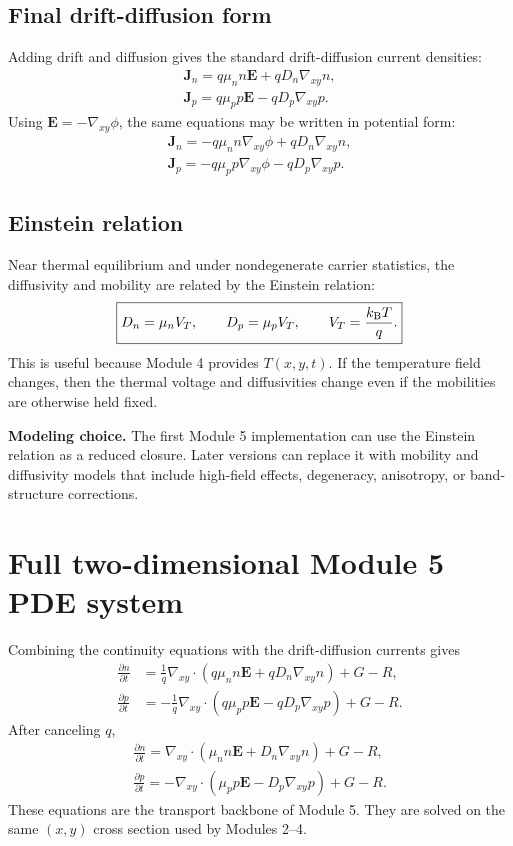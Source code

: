 \documentclass[11pt]{article}
\newcommand{\Evec}{\bm{E}}
\newcommand{\Jvec}{\bm{J}}
\newcommand{\gradxy}{\nabla_{xy}}
\newcommand{\divxy}{\nabla_{xy}\cdot}
\begin{document}
\subsection{Final drift-diffusion form}

Adding drift and diffusion gives the standard drift-diffusion current densities:
\begin{align}
\boxed{\Jvec_n=q\mu_n n\Evec+qD_n\gradxy n,} \\
\boxed{\Jvec_p=q\mu_p p\Evec-qD_p\gradxy p.}
\end{align}
Using \(\Evec=-\gradxy\phi\), the same equations may be written in potential form:
\begin{align}
\boxed{\Jvec_n=-q\mu_n n\gradxy\phi+qD_n\gradxy n,} \\
\boxed{\Jvec_p=-q\mu_p p\gradxy\phi-qD_p\gradxy p.}
\end{align}

\subsection{Einstein relation}

Near thermal equilibrium and under nondegenerate carrier statistics, the diffusivity and mobility are related by the Einstein relation:
\begin{equation}
\boxed{D_n=\mu_n V_T,\qquad D_p=\mu_p V_T,\qquad V_T=\frac{k_{\mathrm{B}} T}{q}.}
\end{equation}
This is useful because Module 4 provides \(T(x,y,t)\). If the temperature field changes, then the thermal voltage and diffusivities change even if the mobilities are otherwise held fixed.

\begin{notebox}
\textbf{Modeling choice.} The first Module 5 implementation can use the Einstein relation as a reduced closure. Later versions can replace it with mobility and diffusivity models that include high-field effects, degeneracy, anisotropy, or band-structure corrections.
\end{notebox}

\section{Full two-dimensional Module 5 PDE system}

Combining the continuity equations with the drift-diffusion currents gives
\begin{align}
\frac{\partial n}{\partial t}
&=\frac{1}{q}\divxy\left(q\mu_n n\Evec+qD_n\gradxy n\right)+G-R, \\
\frac{\partial p}{\partial t}
&=-\frac{1}{q}\divxy\left(q\mu_p p\Evec-qD_p\gradxy p\right)+G-R.
\end{align}
After canceling \(q\),
\begin{align}
\boxed{\frac{\partial n}{\partial t}
=\divxy\left(\mu_n n\Evec+D_n\gradxy n\right)+G-R,} \\
\boxed{\frac{\partial p}{\partial t}
=-\divxy\left(\mu_p p\Evec-D_p\gradxy p\right)+G-R.}
\end{align}
These equations are the transport backbone of Module 5. They are solved on the same \((x,y)\) cross section used by Modules 2--4.
\end{document}
